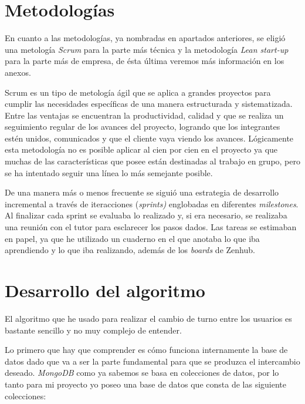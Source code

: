   \section{Metodologías}\label{metodologia}

En cuanto a las metodologías, ya nombradas en apartados anteriores, se eligió una metología \emph{Scrum} para la parte más técnica y la metodología \emph{Lean start-up} para la parte más de empresa, de ésta última veremos más información en los anexos.

Scrum es un tipo de metología ágil que se aplica a grandes proyectos para cumplir las necesidades específicas de una manera estructurada y sistematizada. Entre las ventajas se encuentran la productividad, calidad y que se realiza un seguimiento regular de los avances del proyecto, logrando que los integrantes estén unidos, comunicados y que el cliente vaya viendo los avances. Lógicamente esta metodología no es posible aplicar al cien por cien en el proyecto ya que muchas de las características que posee están destinadas al trabajo en grupo, pero se ha intentado seguir una línea lo más semejante posible. 


 
 De una manera más o menos frecuente se siguió una estrategia de desarrollo incremental a través de iteracciones (\emph{sprints)} englobadas en diferentes \emph{milestones}. Al finalizar cada sprint se evaluaba lo realizado y, si era necesario, se realizaba una reunión con el tutor para esclarecer los pasos dados. Las tareas se estimaban en papel, ya que he utilizado un cuaderno en el que anotaba lo que iba aprendiendo y lo que iba realizando, además de los  \emph{boards} de Zenhub. 
 
   \section{Desarrollo del algoritmo}\label{algoritmo}
   El algoritmo que he usado para realizar el cambio de turno entre los usuarios es bastante sencillo y no muy complejo de entender.
   
   Lo primero que hay que comprender es cómo funciona internamente la base de datos dado que va a ser la parte fundamental para que se produzca el intercambio deseado. \emph{MongoDB} como ya sabemos  se basa en colecciones de datos, por lo tanto para mi proyecto yo poseo una base de datos que consta de las siguiente colecciones:
   
